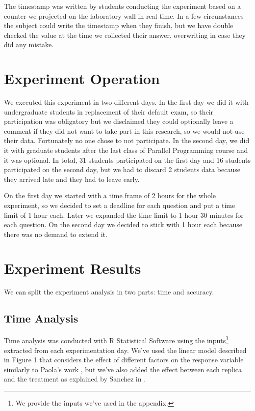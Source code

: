 The timestamp was written by students conducting the experiment based on a counter we projected on the laboratory wall in real time. In a few circunstances the subject could write the timestamp when they finish, but we have double checked the value at the time we collected their answer, overwriting in case they did any mistake.

\section{Experiment Operation}

We executed this experiment in two different days. In the first day we did it with undergraduate students in replacement of their default exam, so their participation was obligatory but we disclaimed they could optionally leave a comment if they did not want to take part in this research, so we would not use their data. Fortunately no one chose to not participate. In the second day, we did it with graduate students after the last class of Parallel Programming course and it was optional. In total, 31 students participated on the first day and 16 students participated on the second day, but we had to discard 2 students data because they arrived late and they had to leave early.

On the first day we started with a time frame of 2 hours for the whole experiment, so we decided to set a deadline for each question and put a time limit of 1 hour each. Later we expanded the time limit to 1 hour 30 minutes for each question. On the second day we decided to stick with 1 hour each because there was no demand to extend it.

\section{Experiment Results}

We can split the experiment analysis in two parts: time and accuracy.

\subsection{Time Analysis}

Time analysis was conducted with R Statistical Software using the inputs\footnote{We provide the inputs we've used in the appendix.} extracted from each experimentation day. We've used the linear model described in Figure 1 that considers the effect of different factors on the response variable similarly to Paola's work \cite{paola}, but we've also added the effect between each replica and the treatment as explained by Sanchez in \cite{sanchez}.

